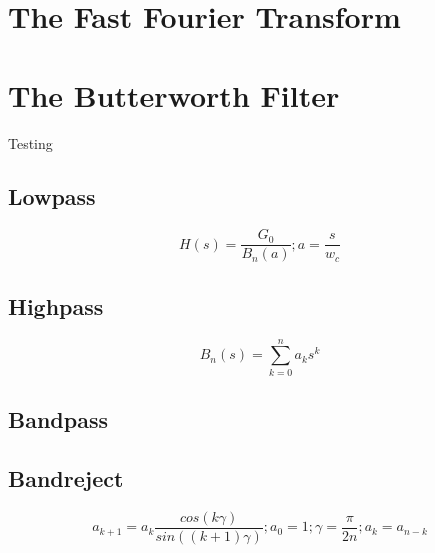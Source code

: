 \documentclass[american, twoside]{article}
\begin{document}
\section{The Fast Fourier Transform} \label{FFT}

\section{The Butterworth Filter} \label{Butterworth}
Testing\autocite{butterworthWikipedia}
\subsection{Lowpass} \label{Butterworth:Lowpass}
\begin{equation} \label{butterworth:lowpass_generic}
    H(s) = \frac{G_{0}}{B_{n}(a)}; a = \frac{s}{w_{c}}
\end{equation}

\subsection{Highpass} \label{Butterworth:Highpass}
\begin{equation} \label{butterworth:polynomial}
    B_{n}(s) = \sum_{k = 0}^{n} a_{k}s^{k}
\end{equation}

\subsection{Bandpass} \label{Butterworth:Bandpass}
\subsection{Bandreject} \label{Butterworth:Bandreject}
\begin{equation} \label{butterowrth:coefficients}
    a_{k + 1} = a_{k}\frac{cos\left(k\gamma\right)}{sin((k + 1)\gamma)}; a_{0} = 1; \gamma = \frac{\pi}{2n}; a_{k} = a_{n - k}
\end{equation}

\newpage
\printbibliography[heading=bibintoc]
\end{document}

